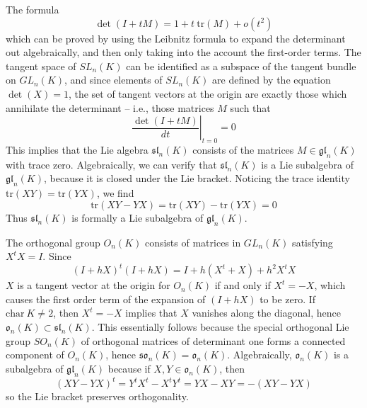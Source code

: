 \begin{example}
    The formula
    \[ \det(I + tM) = 1 + t\ \text{tr}(M) + o(t^2) \]
    which can be proved by using the Leibnitz formula to expand the determinant out algebraically, and then only taking into the account the first-order terms. The tangent space of $SL_n(K)$ can be identified as a subspace of the tangent bundle on $GL_n(K)$, and since elements of $SL_n(K)$ are defined by the equation $\det(X) = 1$, the set of tangent vectors at the origin are exactly those which annihilate the determinant -- i.e., those matrices $M$ such that
    \[ \left. \frac{\det(I + tM)}{dt} \right|_{t = 0} = 0 \]
    This implies that the Lie algebra $\mathfrak{sl}_n(K)$ consists of the matrices $M \in \mathfrak{gl}_n(K)$ with trace zero. Algebraically, we can verify that $\mathfrak{sl}_n(K)$ is a Lie subalgebra of $\mathfrak{gl}_n(K)$, because it is closed under the Lie bracket. Noticing the trace identity $\text{tr}(XY) = \text{tr}(YX)$, we find
    \[ \text{tr}(XY - YX) = \text{tr}(XY) - \text{tr}(YX) = 0 \]
    Thus $\mathfrak{sl}_n(K)$ is formally a Lie subalgebra of $\mathfrak{gl}_n(K)$.
\end{example}

\begin{example}
    The orthogonal group $O_n(K)$ consists of matrices in $GL_n(K)$ satisfying $X^tX = I$. Since
    \[ (I + hX)^t(I + hX) = I + h(X^t + X) + h^2X^tX \]
    $X$ is a tangent vector at the origin for $O_n(K)$ if and only if $X^t = -X$, which causes the first order term of the expansion of $(I + hX)$ to be zero. If $\text{char}\ K \neq 2$, then $X^t = -X$ implies that $X$ vanishes along the diagonal, hence $\mathfrak{o}_n(K) \subset \mathfrak{sl}_n(K)$. This essentially follows because the special orthogonal Lie group $SO_n(K)$ of orthogonal matrices of determinant one forms a connected component of $O_n(K)$, hence $\mathfrak{so}_n(K) = \mathfrak{o}_n(K)$. Algebraically, $\mathfrak{o}_n(K)$ is a subalgebra of $\mathfrak{gl}_n(K)$ because if $X,Y \in \mathfrak{o}_n(K)$, then
    \[ (XY - YX)^t = Y^tX^t - X^tY^t = YX - XY = -(XY - YX) \]
    so the Lie bracket preserves orthogonality.
\end{example}


